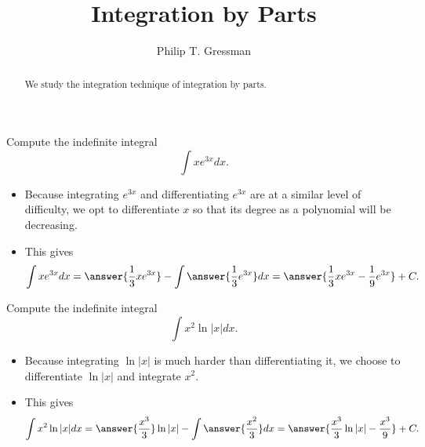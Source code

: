 \documentclass{ximera}
\title{Integration by Parts}
\author{Philip T. Gressman}
\begin{document}
\begin{abstract}
We study the integration technique of integration by parts.
\end{abstract}
\maketitle


\begin{example}
Compute the indefinite integral
\[ \int x e^{3x} dx. \]
\begin{itemize}
\item Because integrating $e^{3x}$ and differentiating $e^{3x}$ are at a similar level of difficulty, we opt to differentiate $x$ so that its degree as a polynomial will be decreasing.
\item This gives
\[ \int x e^{3x} dx = \answer{\frac{1}{3} x e^{3x}} - \int \answer{ \frac{1}{3} e^{3x} } dx = \answer{ \frac{1}{3} x e^{3x} - \frac{1}{9} e^{3x} } + C. \]
\end{itemize}
\end{example}


\begin{example}
Compute the indefinite integral
\[ \int x^2 \ln |x| dx. \]
\begin{itemize}
\item Because integrating $\ln |x|$ is much harder than differentiating it, we choose to differentiate $\ln |x|$ and integrate $x^2$. 
\item This gives
\[ \int x^2 \ln |x| dx = \answer{\frac{x^3}{3}} \ln |x| - \int \answer{\frac{x^2}{3}} dx = \answer{ \frac{x^3}{3} \ln |x| - \frac{x^3}{9}} + C. \]
\end{itemize}
\end{example}
\end{document}
